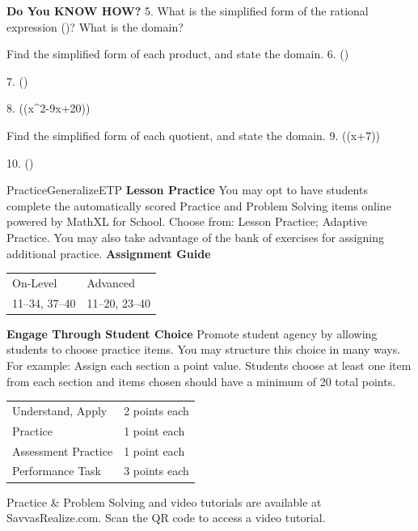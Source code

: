 \documentclass{article}
\newenvironment{concept-summary}{}{}    %
\newenvironment{te-addendum}[2]{}{}     %
\newcommand{\answer}[1]{}               %
\newcommand{\te}[1]{}                   %
\begin{document}
\begin{concept-summary}
\answer{When the denominator equals 0, fractions are undefined.}
\textbf{Do You KNOW HOW?}
5. What is the simplified form of the rational expression ()? What is the domain?
\answer{(\frac{x-6}{x-3}) for all (x) except -6 and 3.}
Find the simplified form of each product, and state the domain.
6. (\cdot{})
\answer{(\frac{xz}{y}), (x\neq0), (y\neq0), and (z\neq0).}
7. (\cdot{})
\answer{(\frac{y+2}{y-3}), (y\neq-3,3,\text{ or }-2).}
8. (\cdot(x^2-9x+20))
\answer{((x-2)(x-4)) for all (x) except 5 and -5.}
Find the simplified form of each quotient, and state the domain.
9. (\div(x+7))
\answer{(\frac{x}{x-4}) for all (x) except 4 and -7.}
10. (\div{})
\answer{(\frac{2x(x+4)}{x+1}) for all (x) except -6, 6, -1, 0, and (\frac12).}
\te{Concept Summary, Do You Understand, and Do You Know How are available at SavvasRealize.com.}
\end{concept-summary}
\begin{te-addendum}{Practice}{GeneralizeETP}
\textbf{Lesson Practice} You may opt to have students complete the automatically scored Practice and Problem Solving items online powered by MathXL for School.
Choose from: Lesson Practice; Adaptive Practice.
You may also take advantage of the bank of exercises for assigning additional practice.
\textbf{Assignment Guide}
\begin{tabular}{ll}
On-Level & Advanced \\
11--34, 37--40 & 11--20, 23--40 \\
\end{tabular}
\textbf{Engage Through Student Choice}
Promote student agency by allowing students to choose practice items. You may structure this choice in many ways.
For example:
Assign each section a point value. Students choose at least one item from each section and items chosen should have a minimum of 20 total points.
\begin{tabular}{ll}
Understand, Apply & 2 points each \\
Practice & 1 point each \\
Assessment Practice & 1 point each \\
Performance Task & 3 points each \\
\end{tabular}
Practice \& Problem Solving and video tutorials are available at SavvasRealize.com. Scan the QR code to access a video tutorial.
\end{te-addendum}
\end{document}
